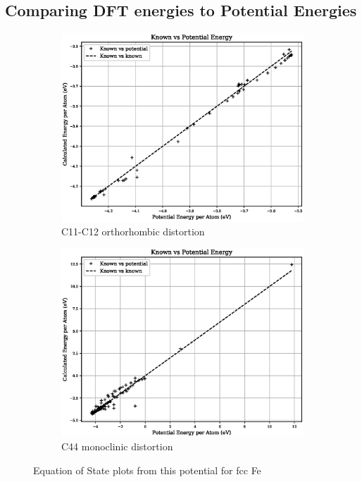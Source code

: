 \subsection{Comparing DFT energies to Potential Energies}

\begin{figure}[htb]
\begin{subfigure}{.42\textwidth}
  \centering
  \includegraphics[width=.94\linewidth]{chapters/results_potential_fitting/fepd_potential/potential_known_energy_fit_set.eps}  
  \caption{C11-C12 orthorhombic distortion}
  \label{fig:fepd-fefcc-rose}
\end{subfigure}
\begin{subfigure}{.42\textwidth}
  \centering
  \includegraphics[width=.94\linewidth]{chapters/results_potential_fitting/fepd_potential/potential_known_energy_full_set.eps}  
  \caption{C44 monoclinic distortion}
  \label{fig:fepd-fefcc-bmeos}
\end{subfigure}
\label{fig:fig:fepd-fefcc-equation-of-state}
\caption{Equation of State plots from this potential for \acrshort{fcc} Fe}
\end{figure}




